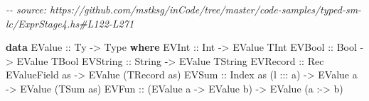 \documentclass[]{article}
\newenvironment{Shaded}{}{}
\newcommand{\CommentTok}[1]{\textcolor[rgb]{0.38,0.63,0.69}{\textit{#1}}}
\newcommand{\DataTypeTok}[1]{\textcolor[rgb]{0.56,0.13,0.00}{#1}}
\newcommand{\KeywordTok}[1]{\textcolor[rgb]{0.00,0.44,0.13}{\textbf{#1}}}
\newcommand{\NormalTok}[1]{#1}
\newcommand{\OperatorTok}[1]{\textcolor[rgb]{0.40,0.40,0.40}{#1}}
\newcommand{\OtherTok}[1]{\textcolor[rgb]{0.00,0.44,0.13}{#1}}
\begin{document}
\begin{Shaded}
\begin{Highlighting}[]
\CommentTok{{-}{-} source: https://github.com/mstksg/inCode/tree/master/code{-}samples/typed{-}sm{-}lc/ExprStage4.hs\#L122{-}L271}

\KeywordTok{data} \DataTypeTok{EValue}\OtherTok{ ::} \DataTypeTok{Ty} \OtherTok{{-}\textgreater{}} \DataTypeTok{Type} \KeywordTok{where}
  \DataTypeTok{EVInt}\OtherTok{ ::} \DataTypeTok{Int} \OtherTok{{-}\textgreater{}} \DataTypeTok{EValue} \DataTypeTok{TInt}
  \DataTypeTok{EVBool}\OtherTok{ ::} \DataTypeTok{Bool} \OtherTok{{-}\textgreater{}} \DataTypeTok{EValue} \DataTypeTok{TBool}
  \DataTypeTok{EVString}\OtherTok{ ::} \DataTypeTok{String} \OtherTok{{-}\textgreater{}} \DataTypeTok{EValue} \DataTypeTok{TString}
  \DataTypeTok{EVRecord}\OtherTok{ ::} \DataTypeTok{Rec} \DataTypeTok{EValueField}\NormalTok{ as }\OtherTok{{-}\textgreater{}} \DataTypeTok{EValue}\NormalTok{ (}\DataTypeTok{TRecord}\NormalTok{ as)}
  \DataTypeTok{EVSum}\OtherTok{ ::} \DataTypeTok{Index}\NormalTok{ as (l }\OperatorTok{:::}\NormalTok{ a) }\OtherTok{{-}\textgreater{}} \DataTypeTok{EValue}\NormalTok{ a }\OtherTok{{-}\textgreater{}} \DataTypeTok{EValue}\NormalTok{ (}\DataTypeTok{TSum}\NormalTok{ as)}
  \DataTypeTok{EVFun}\OtherTok{ ::}\NormalTok{ (}\DataTypeTok{EValue}\NormalTok{ a }\OtherTok{{-}\textgreater{}} \DataTypeTok{EValue}\NormalTok{ b) }\OtherTok{{-}\textgreater{}} \DataTypeTok{EValue}\NormalTok{ (a }\OperatorTok{:{-}\textgreater{}}\NormalTok{ b)}


\end{Highlighting}
\end{Shaded}
\end{document}
